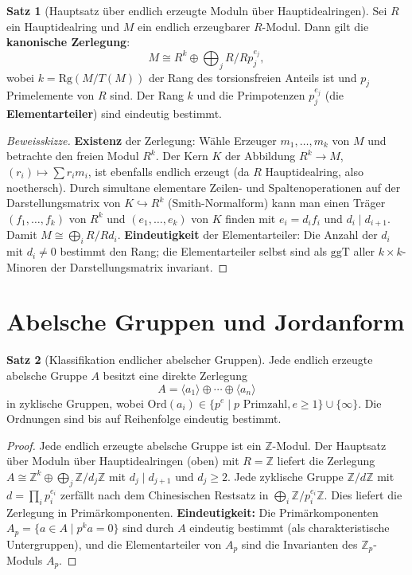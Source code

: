 ﻿\documentclass[a4paper,12pt]{report}
\theoremstyle{definition}
\newtheorem{satz}{Satz}
\begin{document}
\begin{satz}[Hauptsatz über endlich erzeugte Moduln über Hauptidealringen]
    Sei $R$ ein Hauptidealring und $M$ ein endlich erzeugbarer $R$-Modul.
    Dann gilt die \textbf{kanonische Zerlegung}:
    \[
        M \cong R^k \oplus \bigoplus_{j} R/R p_j^{e_j},
    \]
    wobei $k = \mathrm{Rg}(M/T(M))$ der Rang des torsionsfreien Anteils
    ist und $p_j$ Primelemente von $R$ sind. Der Rang $k$ und die
    Primpotenzen $p_j^{e_j}$ (die \textbf{Elementarteiler}) sind
    eindeutig bestimmt.
\end{satz}
\begin{proof}[Beweisskizze]
    \textbf{Existenz} der Zerlegung: Wähle Erzeuger $m_1, \ldots, m_k$ von $M$
    und betrachte den freien Modul $R^k$. Der Kern $K$ der Abbildung
    $R^k \to M$, $(r_i) \mapsto \sum r_i m_i$, ist ebenfalls endlich erzeugt
    (da $R$ Hauptidealring, also noethersch). Durch simultane elementare Zeilen-
    und Spaltenoperationen auf der Darstellungsmatrix von $K \hookrightarrow R^k$
    (Smith-Normalform) kann man einen Träger $(f_1, \ldots, f_k)$ von $R^k$ und
    $(e_1, \ldots, e_k)$ von $K$ finden mit $e_i = d_i f_i$ und $d_i \mid d_{i+1}$.
    Damit $M \cong \bigoplus_{i} R/Rd_i$.
    \textbf{Eindeutigkeit} der Elementarteiler: Die Anzahl der $d_i$ mit $d_i \neq 0$
    bestimmt den Rang; die Elementarteiler selbst sind als $\mathrm{ggT}$
    aller $k \times k$-Minoren der Darstellungsmatrix invariant.
\end{proof}

\section{Abelsche Gruppen und Jordanform}

\begin{satz}[Klassifikation endlicher abelscher Gruppen]
    Jede endlich erzeugte abelsche Gruppe $A$ besitzt eine direkte
    Zerlegung
    \[
        A = \langle a_1 \rangle \oplus \cdots \oplus \langle a_n \rangle
    \]
    in zyklische Gruppen, wobei $\mathrm{Ord}(a_i) \in \{p^e \mid p
    \text{ Primzahl}, e \geq 1\} \cup \{\infty\}$. Die Ordnungen sind
    bis auf Reihenfolge eindeutig bestimmt.
\end{satz}
\begin{proof}
    Jede endlich erzeugte abelsche Gruppe ist ein $\mathbb{Z}$-Modul.
    Der Hauptsatz über Moduln über Hauptidealringen (oben) mit $R = \mathbb{Z}$
    liefert die Zerlegung $A \cong \mathbb{Z}^k \oplus \bigoplus_j \mathbb{Z}/d_j\mathbb{Z}$
    mit $d_j \mid d_{j+1}$ und $d_j \geq 2$.
    Jede zyklische Gruppe $\mathbb{Z}/d\mathbb{Z}$ mit $d = \prod_i p_i^{e_i}$
    zerfällt nach dem Chinesischen Restsatz in $\bigoplus_i \mathbb{Z}/p_i^{e_i}\mathbb{Z}$.
    Dies liefert die Zerlegung in Primärkomponenten.
    \textbf{Eindeutigkeit:} Die Primärkomponenten $A_p = \{a \in A \mid p^k a = 0\}$
    sind durch $A$ eindeutig bestimmt (als charakteristische Untergruppen),
    und die Elementarteiler von $A_p$ sind die Invarianten des $\mathbb{Z}_p$-Moduls $A_p$.
\end{proof}
\end{document}
